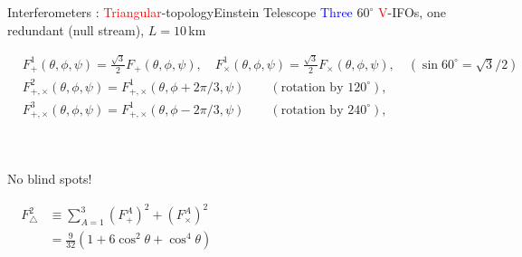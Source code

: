\documentclass[xcolor=dvipsnames,t]{beamer}
\newcommand{\red}[1]{\textcolor{red}{#1}}
\newcommand{\bl}[1]{\textcolor{blue}{#1}}
\newcommand{\f}{\frac}
\begin{document}
\begin{frame}{Interferometers : \red{Triangular}-topology}{Einstein Telescope}
  \vspace{-2mm}
  \bl{Three} $60^\circ$ \red{V}-IFOs, one redundant (null stream), $L=10\,$km
  {
    \begin{footnotesize}
    \begin{align*}
      &F^1_+(\theta,\phi,\psi)= \f{\sqrt{3}}{2} F_+(\theta,\phi,\psi), \quad F^1_\times(\theta,\phi,\psi)= \f{\sqrt{3}}{2} F_\times(\theta,\phi,\psi),\quad (\sin 60^\circ =\sqrt{3}/2)\\
      & F^2_{+,\times}(\theta,\phi,\psi) = F^1_{+,\times}(\theta,\phi+2\pi/3,\psi)\qquad (\text{rotation by 120}^\circ),\\
      & F^3_{+,\times}(\theta,\phi,\psi) = F^1_{+,\times}(\theta,\phi-2\pi/3,\psi) \qquad(\text{rotation by 240}^\circ),\\
      \end{align*}
      \end{footnotesize}
    }
    \\
   {
      No blind spots!
      \begin{footnotesize}
      \begin{align*}
      F^2_\bigtriangleup &\equiv \sum_{A=1}^3 \left(F^A_+\right)^2+\left(F^A_\times\right)^2 \hspace{8cm}\\ 
      &= \f{9}{32}\left(1+6\cos^2\theta + \cos^4\theta\right)
      \end{align*}
      \end{footnotesize}
  }
\end{frame}
\end{document}
